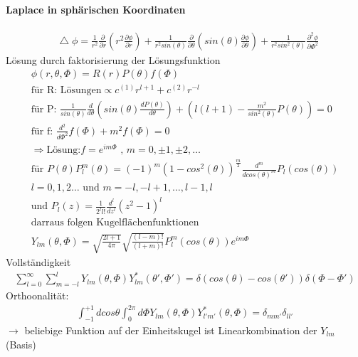 \documentclass[a4paper]{article}
\newcommand*\laplace{\mathop{}\!\mathbin\bigtriangleup}
\begin{document}
\paragraph{Laplace in sphärischen Koordinaten}
\begin{align}
\laplace\phi=\frac{1}{r^2}\frac{\partial}{\partial r}\left( r^2
\frac{\partial\phi}{\partial r} \right)+\frac{1}{r^2 sin(\theta)}
\frac{\partial}{\partial \theta}\left( sin(\theta) \frac{\partial\phi} 
{\partial \theta} \right)+\frac{1}{r^2 sin^2(\theta)} \frac{\partial^2\phi} 
{\partial \Phi^2}
\end{align}
Lösung durch faktorisierung der Lösungsfunktion 
\begin{align}
\phi(r,\theta,\Phi)=R(r)P(\theta)f(\Phi)\\
\text{für R:  Lösungen}\propto c^{(1)}r^{l+1}+c^{(2)} r^{-l}\\
\text{für P:  }\frac{1}{sin(\theta)}\frac{d}{d\theta}\left( sin(\theta)
\frac{dP(\theta)}{d\theta}\right)+\left( l(l+1)-\frac{m^2}{sin^2(\theta)} 
P(\theta) \right)=0\\
\text{für f:  }\frac{d^2}{d\Phi^2}f(\Phi)+m^2f(\Phi)=0\\
\Rightarrow \text{Lösung:} f=e^{im\Phi} \text{ , }m=0,\pm1,\pm2,\ldots\\
\text{für }P(\theta) P_l^m(\theta)=(-1)^m
(1-cos^2(\theta))^{\frac{m}{2}}\frac{d^m}{dcos(\theta)^m}P_l(cos(\theta))\\
l=0,1,2\ldots \text{ und } m=-l,-l+1,\ldots,l-1,l\\
\text{und }P_l(z)=\frac{1}{2^ll!}\frac{d^l}{dz^l}(z^2-1)^l\\
\text{darraus folgen Kugelflächenfunktionen}\\
Y_{lm}(\theta,\Phi)=\sqrt{\frac{2l+1}{4\pi}}\sqrt{\frac{(l-m)!}{(l+m)!}}
P^m_l(cos(\theta))e^{im\Phi}
\end{align}
Vollständigkeit
\begin{align}
\sum_{l=0}^\infty\sum_{m=-l}^l Y_{lm}(\theta,\Phi) Y_{lm}^*(\theta',\Phi')
=\delta(cos(\theta)-cos(\theta'))\delta(\Phi-\Phi')
\end{align}
Orthoonalität:
\begin{align}
\int_{-1}^{+1}dcos\theta\int_0^{2\pi}d\Phi Y_{lm}(\theta,\Phi)
Y_{l'm'}^*(\theta,\Phi)=\delta_{mm'}\delta_{ll'}
\end{align}
$\rightarrow$ beliebige Funktion auf der Einheitskugel ist Linearkombination
der $Y_{lm}$ (Basis)
\end{document}
